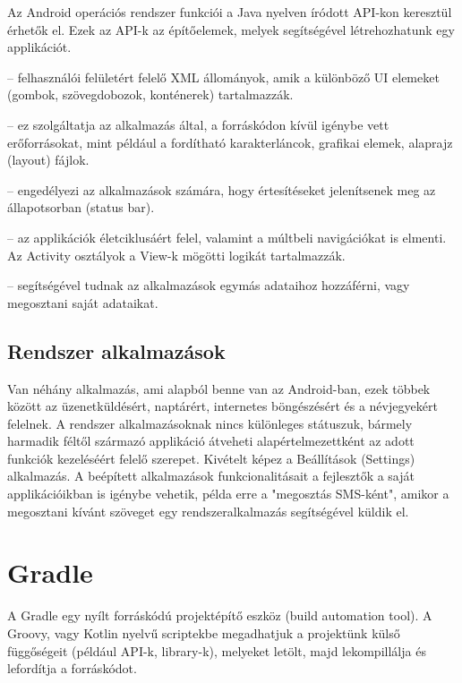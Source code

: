 Az Android operációs rendszer funkciói a Java nyelven íródott API-kon keresztül érhetők el. Ezek az API-k az építőelemek, melyek segítségével létrehozhatunk egy applikációt.

\begin{description}
	\setlength{\itemsep}{0.04mm}
	\item[View rendszer] -- felhasználói felületért felelő XML állományok, amik a különböző UI elemeket (gombok, szövegdobozok, konténerek) tartalmazzák.
	\item[Erőforráskezelő (Resource Manager)] -- ez szolgáltatja az alkalmazás által, a forráskódon kívül igénybe vett erőforrásokat, mint például a fordítható karakterláncok, grafikai elemek, alaprajz (layout) fájlok.
	\item[Értesítéskezelő (Notification Manager)] -- engedélyezi az alkalmazások számára, hogy értesítéseket jelenítsenek meg az állapotsorban (status bar).
	\item[Activity-kezelő] -- az applikációk életciklusáért felel, valamint a múltbeli navigációkat is elmenti. Az Activity osztályok a View-k mögötti logikát tartalmazzák.
	\item[Tartalom szolgáltató (Content Provider)] -- segítségével tudnak az alkalmazások egymás adataihoz hozzáférni, vagy megosztani saját adataikat.
\end{description}

\subsection{Rendszer alkalmazások}

Van néhány alkalmazás, ami alapból benne van az Android-ban, ezek többek között az üzenetküldésért, naptárért, internetes böngészésért és a névjegyekért felelnek. A rendszer alkalmazásoknak nincs különleges státuszuk, bármely harmadik féltől származó applikáció átveheti alapértelmezettként az adott funkciók kezeléséért felelő szerepet. Kivételt képez a Beállítások (Settings) alkalmazás. A beépített alkalmazások funkcionalitásait a fejlesztők a saját applikációikban is igénybe vehetik, példa erre a "megosztás SMS-ként", amikor a megosztani kívánt szöveget egy rendszeralkalmazás segítségével küldik el.


\section{Gradle}

A Gradle\cite{gradle} egy nyílt forráskódú projektépítő eszköz (build automation tool). A Groovy, vagy Kotlin nyelvű scriptekbe megadhatjuk a projektünk külső függőségeit (például API-k, library-k), melyeket letölt, majd lekompillálja és lefordítja a forráskódot.


